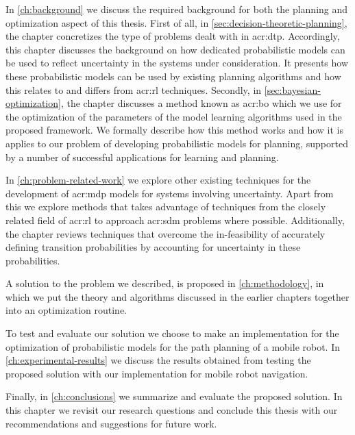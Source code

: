 In \autoref{ch:background} we discuss the required background for both the planning and optimization aspect of this thesis.
First of all, in \autoref{sec:decision-theoretic-planning}, the chapter concretizes the type of problems dealt with in \acrshort{acr:dtp}. 
Accordingly, this chapter discusses the background on how dedicated probabilistic models can be used to reflect uncertainty in the systems under consideration.
It presents how these probabilistic models can be used by existing planning algorithms and how this relates to and differs from \acrshort{acr:rl} techniques.
Secondly, in \autoref{sec:bayesian-optimization}, the chapter discusses a method known as \acrlong{acr:bo} which we use for the optimization of the parameters of the model learning algorithms used in the proposed framework.
We formally describe how this method works and how it is applies to our problem of developing probabilistic models for planning, supported by a number of successful applications for learning and planning.

In \autoref{ch:problem-related-work} we explore other existing techniques for the development of \acrshort{acr:mdp} models for systems involving uncertainty.
Apart from this we explore methods that takes advantage of techniques from the closely related field of \acrshort{acr:rl} to approach \acrshort{acr:sdm} problems where possible.
Additionally, the chapter reviews techniques that overcome the in-feasibility of accurately defining transition probabilities by accounting for uncertainty in these probabilities.

A solution to the problem we described, is proposed in \autoref{ch:methodology}, in which we put the theory and algorithms discussed in the earlier chapters together into an optimization routine.

To test and evaluate our solution we choose to make an implementation for the optimization of probabilistic models for the path planning of a mobile robot.
In \autoref{ch:experimental-results} we discuss the results obtained from testing the proposed solution with our implementation for mobile robot navigation.

Finally, in \autoref{ch:conclusions} we summarize and evaluate the proposed solution. In this chapter we revisit our research questions and conclude this thesis with our recommendations and suggestions for future work.

%
